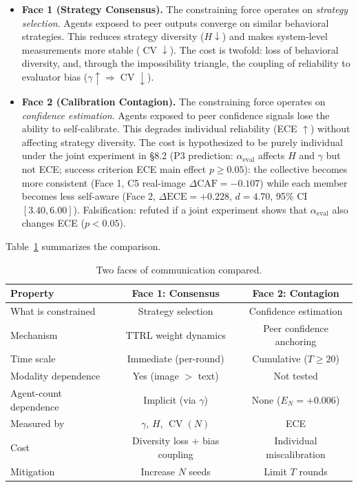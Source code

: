 \documentclass[11pt]{article}
\DeclareMathOperator{\CV}{CV}
\begin{document}
\begin{itemize}[leftmargin=*,nosep]
 \item \textbf{Face 1 (Strategy Consensus).} The constraining force operates on \textit{strategy selection}. Agents exposed to peer outputs converge on similar behavioral strategies. This reduces strategy diversity ($H \downarrow$) and makes system-level measurements more stable ($\CV \downarrow$). The cost is twofold: loss of behavioral diversity, and, through the impossibility triangle, the coupling of reliability to evaluator bias ($\gamma \uparrow \Rightarrow \CV \downarrow$).
 \item \textbf{Face 2 (Calibration Contagion).} The constraining force operates on \textit{confidence estimation}. Agents exposed to peer confidence signals lose the ability to self-calibrate. This degrades individual reliability (ECE $\uparrow$) without affecting strategy diversity. The cost is hypothesized to be purely individual under the joint experiment in §8.2 (P3 prediction: $\alpha_{\text{eval}}$ affects $H$ and $\gamma$ but not ECE; success criterion ECE main effect $p \geq 0.05$): the collective becomes more consistent (Face 1, C5 real-image $\Delta\text{CAF} = -0.107$) while each member becomes less self-aware (Face 2, $\Delta\text{ECE} = +0.228$, $d = 4.70$, 95\% CI $[3.40, 6.00]$). Falsification: refuted if a joint experiment shows that $\alpha_{\text{eval}}$ also changes ECE ($p < 0.05$).
\end{itemize}

Table~\ref{tab:comparison} summarizes the comparison.

\begin{table}[H]
\centering
\caption{Two faces of communication compared.}
\label{tab:comparison}
\begin{tabular}{@{}lcc@{}}
\toprule
\textbf{Property} & \textbf{Face 1: Consensus} & \textbf{Face 2: Contagion} \\
\midrule
What is constrained  & Strategy selection & Confidence estimation \\
Mechanism            & TTRL weight dynamics & Peer confidence anchoring \\
Time scale           & Immediate (per-round) & Cumulative ($T \geq 20$) \\
Modality dependence  & Yes (image $>$ text) & Not tested \\
Agent-count dependence & Implicit (via $\gamma$) & None ($E_N = +0.006$) \\
Measured by          & $\gamma$, $H$, $\CV(N)$ & ECE \\
Cost                 & Diversity loss + bias coupling & Individual miscalibration \\
Mitigation           & Increase $N$ seeds & Limit $T$ rounds \\
\bottomrule
\end{tabular}
\end{table}
\end{document}
